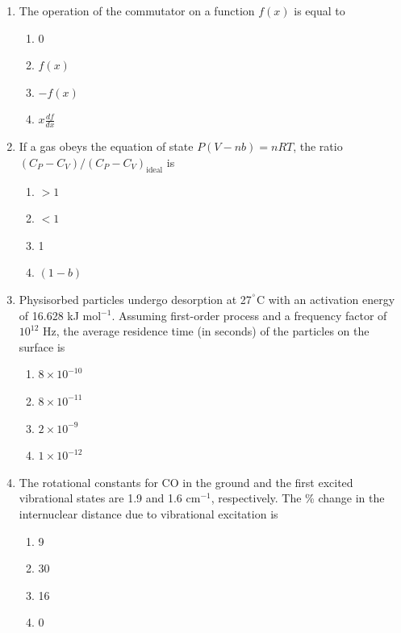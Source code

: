 \documentclass[12pt]{article}
\begin{document}
\begin{enumerate}
\item The operation of the commutator 
 on a function $f(x)$ is equal to

\begin{enumerate}
\item 0
\item $f(x)$
\item $-f(x)$
\item $x \frac{df}{dx}$
\end{enumerate}    \hfill{}




\item If a gas obeys the equation of state $P (V - nb) = nRT$, the ratio $(C_P - C_V)/(C_P - C_V)_{\text{ideal}}$ is

\begin{enumerate}
\item $> 1$
\item $< 1$
\item 1
\item $(1 - b)$
\end{enumerate}    \hfill{}




\item Physisorbed particles undergo desorption at 27$^\degree$C with an activation energy of 16.628 kJ mol$^{-1}$. Assuming first-order process and a frequency factor of $10^{12}$ Hz, the average residence time (in seconds) of the particles on the surface is

\begin{enumerate}
\item $8 \times 10^{-10}$
\item $8 \times 10^{-11}$
\item $2 \times 10^{-9}$
\item $1 \times 10^{-12}$
\end{enumerate}    \hfill{}




\item The rotational constants for CO in the ground and the first excited vibrational states are 1.9 and 1.6 cm$^{-1}$, respectively. The \% change in the internuclear distance due to vibrational excitation is

\begin{enumerate}
\item 9
\item 30
\item 16
\item 0
\end{enumerate}    \hfill{}





\end{enumerate}
\end{document}
